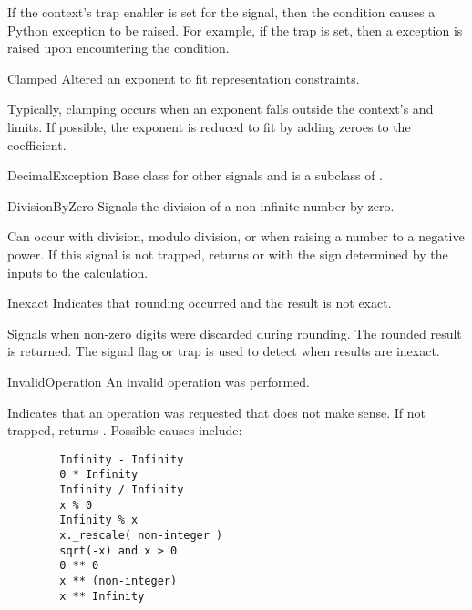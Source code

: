 If the context's trap enabler is set for the signal, then the condition
causes a Python exception to be raised.  For example, if the
 trap is set, then a 
exception is raised upon encountering the condition.


\begin{classdesc*}{Clamped}
    Altered an exponent to fit representation constraints.

    Typically, clamping occurs when an exponent falls outside the context's
     and  limits.  If possible, the exponent is
    reduced to fit by adding zeroes to the coefficient.
\end{classdesc*}

\begin{classdesc*}{DecimalException}
    Base class for other signals and is a subclass of
    .
\end{classdesc*}

\begin{classdesc*}{DivisionByZero}
    Signals the division of a non-infinite number by zero.

    Can occur with division, modulo division, or when raising a number to a
    negative power.  If this signal is not trapped, returns
     or  with the sign determined by
    the inputs to the calculation.
\end{classdesc*}

\begin{classdesc*}{Inexact}
    Indicates that rounding occurred and the result is not exact.

    Signals when non-zero digits were discarded during rounding. The rounded
    result is returned.  The signal flag or trap is used to detect when
    results are inexact.
\end{classdesc*}

\begin{classdesc*}{InvalidOperation}
    An invalid operation was performed.

    Indicates that an operation was requested that does not make sense.
    If not trapped, returns .  Possible causes include:

    \begin{verbatim}
        Infinity - Infinity
        0 * Infinity
        Infinity / Infinity
        x % 0
        Infinity % x
        x._rescale( non-integer )
        sqrt(-x) and x > 0
        0 ** 0
        x ** (non-integer)
        x ** Infinity      
    \end{verbatim}    
\end{classdesc*}

